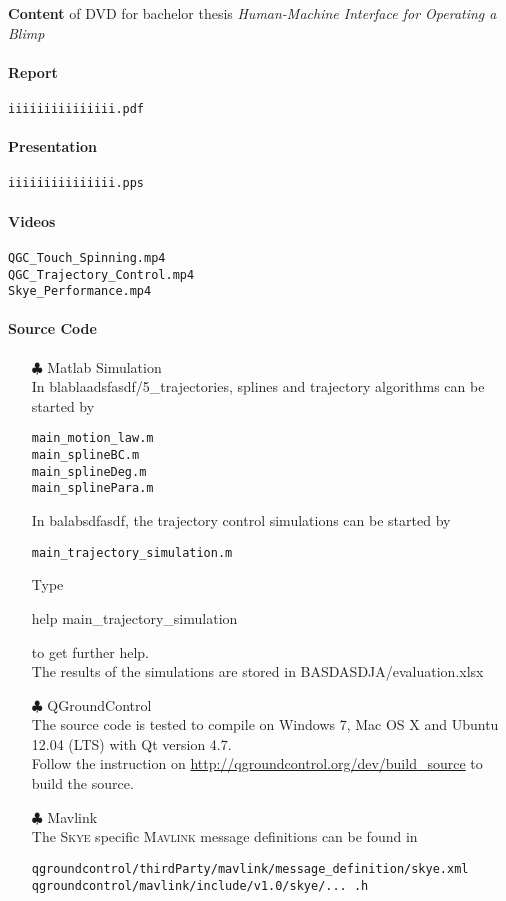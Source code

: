 \documentclass[a4paper]{article}
\begin{document}
\textbf{Content} of DVD for bachelor thesis \textit{Human-Machine Interface for Operating a Blimp} \\

\paragraph{Report}
\begin{verbatim}
iiiiiiiiiiiiiii.pdf
\end{verbatim}

\paragraph{Presentation}
\begin{verbatim}
iiiiiiiiiiiiiii.pps
\end{verbatim}

\paragraph{Videos}
\begin{verbatim}
QGC_Touch_Spinning.mp4
QGC_Trajectory_Control.mp4
Skye_Performance.mp4
\end{verbatim}

\paragraph{Source Code}
\begin{itemize}
\item[$\clubsuit$] Matlab Simulation \\
In blablaadsfasdf/5\_trajectories, splines and trajectory algorithms can be started by 
\begin{verbatim}
main_motion_law.m
main_splineBC.m
main_splineDeg.m
main_splinePara.m
\end{verbatim}
In balabsdfasdf, the trajectory control simulations can be started by
\begin{verbatim}
main_trajectory_simulation.m
\end{verbatim}
Type \begin{scriptsize}help main\_trajectory\_simulation\end{scriptsize} to get further help. \\
The results of the simulations are stored in BASDASDJA/evaluation.xlsx

\item[$\clubsuit$] QGroundControl \\
The source code is tested to compile on Windows 7, Mac OS X and Ubuntu 12.04 (LTS) with Qt version 4.7. \\ Follow the instruction on \url{http://qgroundcontrol.org/dev/build_source} to build the source.
\item[$\clubsuit$] Mavlink \\
The \textsc{Skye} specific \textsc{Mavlink} message definitions can be found in
\begin{verbatim}
qgroundcontrol/thirdParty/mavlink/message_definition/skye.xml
qgroundcontrol/mavlink/include/v1.0/skye/... .h
\end{verbatim}

\end{itemize}
\end{document}
